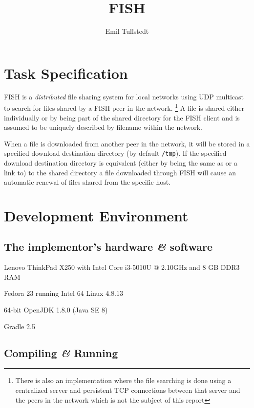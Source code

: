 \documentclass[11pt]{article}
\title{FISH}
\author{Emil Tullstedt}
\begin{document}
\maketitle
\tableofcontents

\section{Task Specification}

FISH is a \textit{distributed} file sharing system for local networks using
UDP multicast to search for files shared by a FISH-peer in the network.
\footnote{There is also an implementation where the file searching is done using
a centralized server and persistent TCP connections between that server and
the peers in the network which is not the subject of this report} A file is
shared either individually or by being part
of the shared directory for the FISH client and is assumed to be uniquely
described by filename within the network.

When a file is downloaded from another peer in the network, it will be stored
in a specified download destination directory (by default \texttt{/tmp}). If
the specified download destination directory is equivalent (either by being the
same as or a link to) to the shared directory a file downloaded through FISH
will cause an automatic renewal of files shared from the specific host.

\section{Development Environment}

\subsection{The implementor's hardware \textit{\&} software}

\begin{description}[align=right,labelwidth=2cm]
\item[Computer] Lenovo ThinkPad X250 with Intel Core i3-5010U @ 2.10GHz and 8 GB DDR3
    RAM
\item[Operating System] Fedora 23 running Intel 64 Linux 4.8.13
\item[Java JRE \& JDK] 64-bit OpenJDK 1.8.0 (Java SE 8)
\item[Build system] Gradle 2.5
\end{description}

\subsection{Compiling \textit{\&} Running}
\label{subsec:compile}
\end{document}
